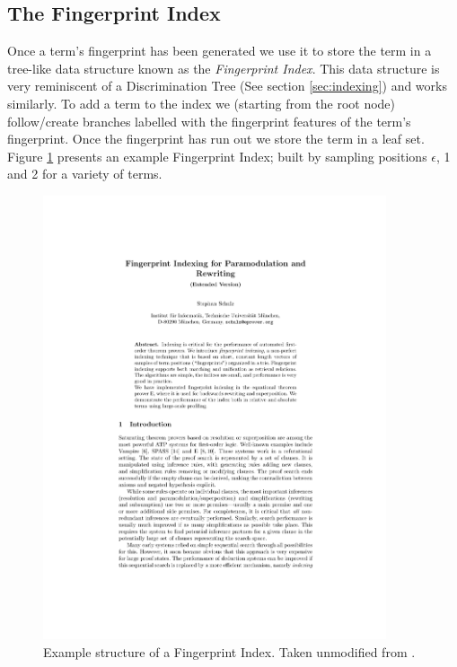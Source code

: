 \subsection{The Fingerprint Index}
\label{sec:fpindex}

Once a term's fingerprint has been generated we use it to store the term in a tree-like
data structure known as the \emph{Fingerprint Index}. 
This data structure is very reminiscent of a Discrimination Tree (See section \ref{sec:indexing})
and works similarly. To add a term to the index we (starting from the root node) follow/create
branches labelled with the fingerprint features of the term's fingerprint. Once the fingerprint has run
out we store the term in a leaf set. Figure \ref{fig:fpindex} presents an example Fingerprint
Index; built by sampling positions $\epsilon$, 1 and 2 for a variety of terms.

\begin{figure}[H]
  \centering
  \includegraphics[page=7,width=0.9\textwidth,trim=5cm 14.3cm 4.8cm 4.5cm,clip]{resources/schulz}
  \caption
   {Example structure of a Fingerprint Index. Taken unmodified from \protect\cite[p7]{shulz12}.}
   \label{fig:fpindex}
\end{figure}

